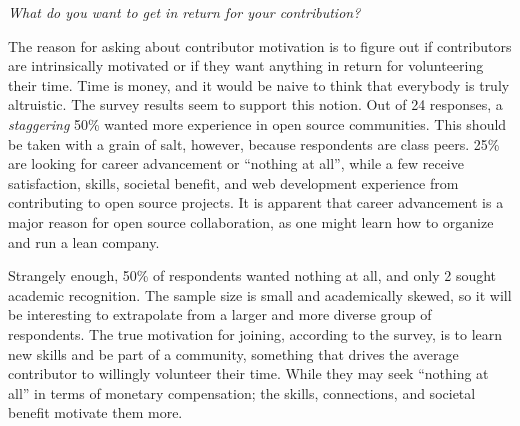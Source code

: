 {\it What do you want to get in return for your contribution?} 

The reason for asking about contributor motivation is to figure out if contributors are intrinsically motivated or if they want anything in return for volunteering their time. Time is money, and it would be naive to think that everybody is truly altruistic. The survey results seem to support this notion. Out of 24 responses, a {\it staggering} 50\% wanted more experience in open source communities. This should be taken with a grain of salt, however, because respondents are class peers. 25\% are looking for career advancement or “nothing at all”, while a few receive satisfaction, skills, societal benefit, and web development experience from contributing to open source projects. It is apparent that career advancement is a major reason for open source collaboration, as one might learn how to organize and run a lean company.

Strangely enough, 50\% of respondents wanted nothing at all, and only 2 sought academic recognition. The sample size is small and academically skewed, so it will be interesting to extrapolate from a larger and more diverse group of respondents. The true motivation for joining, according to the survey, is to learn new skills and be part of a community, something that drives the average contributor to willingly volunteer their time. While they may seek “nothing at all” in terms of monetary compensation; the skills, connections, and societal benefit motivate them more.

